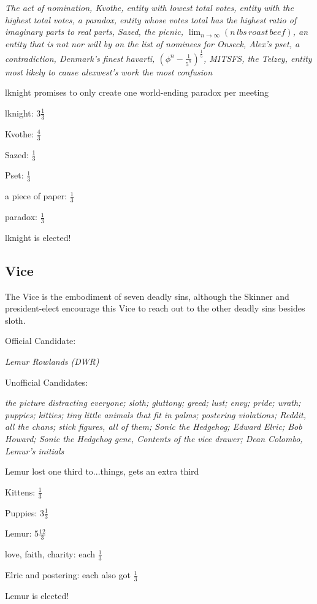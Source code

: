 \documentclass[10pt]{article}
\begin{document}
\emph{The act of nomination, Kvothe, entity with lowest total votes, entity with the highest total votes, a paradox, entity whose votes total has the highest ratio of imaginary parts to real parts, Sazed, the picnic, $\lim_{n\rightarrow\infty}(n\,lbs\,roast\,beef)$, an entity that is not nor will by on the list of nominees for Onseck, Alex's pset, a contradiction, Denmark's finest havarti, $(\phi^{n}-\frac{1}{5^{n}})^\frac{1}{5}$, MITSFS, the Telzey, entity most likely to cause alexwest's work the most confusion}

lknight promises to only create one world-ending paradox per meeting

lknight: $3\frac{1}{3}$

Kvothe: $\frac{4}{3}$

Sazed: $\frac{1}{3}$

Pset: $\frac{1}{3}$

a piece of paper: $\frac{1}{3}$

paradox: $\frac{1}{3}$

lknight is elected!


\subsection*{Vice}

The Vice is the embodiment of seven deadly sins, although the Skinner 
and president-elect encourage this Vice to reach out to the other deadly 
sins besides sloth.

Official Candidate: 

\emph{Lemur Rowlands (DWR)}

Unofficial Candidates: 

\emph{the picture distracting everyone; sloth; gluttony; greed; lust; envy; pride; wrath; puppies; kitties; tiny little animals that fit in palms; postering violations; Reddit, all the chans; stick figures, all of them; Sonic the Hedgehog; Edward Elric; Bob Howard; Sonic the Hedgehog gene, Contents of the vice drawer; Dean Colombo, Lemur's initials}

Lemur lost one third to...things, gets an extra third

Kittens: $\frac{1}{3}$

Puppies: $3\frac{1}{3}$

Lemur: $5\frac{12}{3}$

love, faith, charity: each $\frac{1}{3}$

Elric and postering: each also got $\frac{1}{3}$

Lemur is elected!
\end{document}

